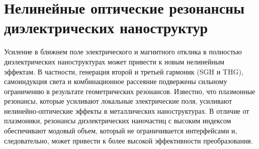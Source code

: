 \section{Нелинейные оптические  резонансны диэлектрических наноструктур}
\hspace*{2mm}Усиление в ближнем поле электрического и магнитного отклика в полностью диэлектрических наноструктурах может привести к новым нелинейным эффектам. В частности, генерация второй и третьей гармоник (SGH и THG), самоиндукция света и комбинационное рассеяние подвержены сильному ограничению в результате геометрических резонансов. Известно, что плазмонные резонансы, которые усиливают локальные электрические поля, усиливают нелинейно-оптические эффекты в металлических наноструктурах. В отличие от плазмоники, резонансы диэлектрических наночастиц с высоким индексом обеспечивают модовый объем, который не ограничивается интерфейсами и, следовательно, может привести к более высокой эффективности преобразования.


